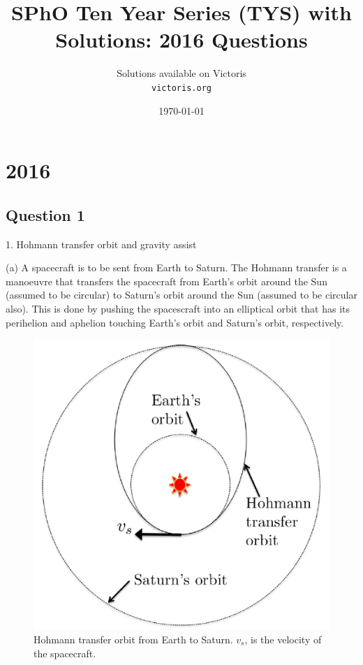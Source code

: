 \documentclass{article}
\title{SPhO Ten Year Series (TYS) with Solutions: 2016 Questions}
\author{
    Solutions available on Victoris\\
    \texttt{victoris.org}
}
\date{\today}
\begin{document}
\maketitle

\section{2016}

\subsection{Question 1}
1. Hohmann transfer orbit and gravity assist

(a) A spacecraft is to be sent from Earth to Saturn. The Hohmann transfer is a manoeuvre that transfers the
spacecraft from Earth’s orbit around the Sun (assumed to be circular) to Saturn’s orbit around the Sun (assumed
to be circular also). This is done by pushing the spacescraft into an elliptical orbit that has its perihelion and
aphelion touching Earth’s orbit and Saturn’s orbit, respectively.

\begin{figure}
	\centering
	\includegraphics[width=0.5\linewidth]{spho_book_TYS_images/2016q1.png}
	\caption{Hohmann transfer orbit from Earth to Saturn. $v_s$, is the velocity of the spacecraft.}
\end{figure}
\end{document}
